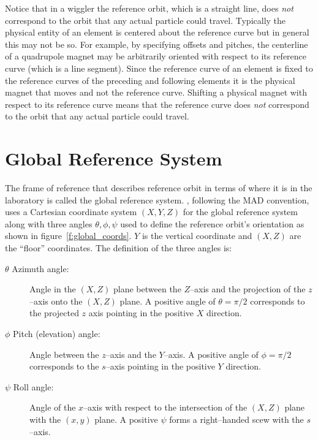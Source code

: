 Notice that in a wiggler the reference orbit, which is a straight
line, does {\em not} correspond to the orbit that any actual particle
could travel. Typically the physical entity of an element is centered
about the reference curve but in general this may not be so. For
example, by specifying offsets and pitches, the centerline of a
quadrupole magnet may be arbitrarily oriented with respect to its
reference curve (which is a line segment). Since the reference curve
of an element is fixed to the reference curves of the preceding and
following elements it is the physical magnet that moves and not the
reference curve. Shifting a physical magnet with respect to its
reference curve means that the reference curve does {\em not}
correspond to the orbit that any actual particle could travel.


\section{Global Reference System}

The frame of reference that describes reference orbit in terms of where it
is in the laboratory is called the global reference system.
\bmad, following the MAD convention, uses a Cartesian coordinate system
$(X, Y, Z)$ for the global reference system along with three angles
$\theta, \phi, \psi$ used to define the reference orbit's orientation
as shown in figure~\ref{f:global_coords}. $Y$ is the vertical
coordinate and $(X, Z)$ are the ``floor'' coordinates.  The definition
of the three angles is:
\begin{description}
\item[$\theta$ Azimuth angle:] Angle in the $(X, Z)$ plane 
between the $Z$--axis and the projection of the $z$--axis onto the
$(X, Z)$ plane. A positive angle of $\theta = \pi/2$ corresponds to the
projected $z$ axis pointing in the positive $X$ direction.
\item[$\phi$ Pitch (elevation) angle:] Angle between the $z$--axis 
and the $Y$--axis. A positive angle of $\phi = \pi/2$ corresponds to
the $s$--axis pointing in the positive $Y$ direction.
\item[$\psi$ Roll angle:] Angle of the $x$--axis with respect 
to the intersection of the $(X, Z)$ plane with the $(x, y)$ plane. A
positive $\psi$ forms a right--handed scew with the $s$--axis.
\end{description}

